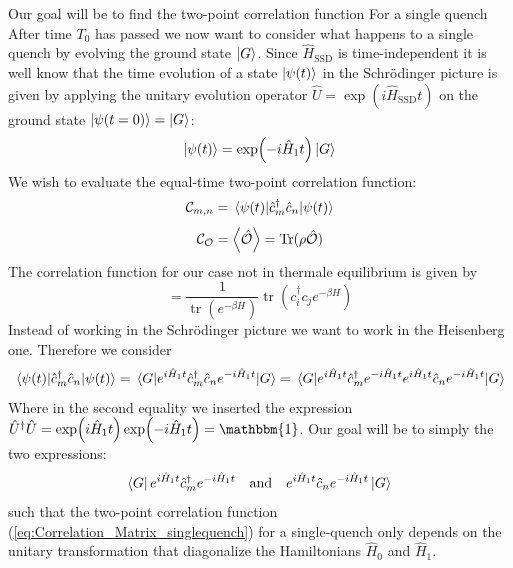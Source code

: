 \documentclass[11pt, a4paper]{article}
\theoremstyle{definition} %
\begin{document}
	Our goal will be to find the two-point correlation function
	For a single quench 
	After time $T_0$ has passed we now want to consider what happens to a single quench by evolving the ground state $\ket{G}$. Since $\hat{H}_\text{SSD}$ is time-independent it is well know that the time evolution of a state $\ket{\psi(t)}$ in the Schrödinger picture is given by applying the unitary evolution operator $\hat{U} = \exp(i\hat{H}_\text{SSD} t)$ on the ground state $\ket{\psi(t=0)} = \ket{G}$:
	\begin{equation}
		\ket{\psi(t)} = \exp(-i \hat{H}_1 t) \ket{G}
	\end{equation}
	We wish to evaluate the equal-time two-point correlation function:
	\begin{equation}
	\mathcal{C}_{m,n} = \mel{\psi(t)}{\hat{c}_m^\dagger \hat{c}_n}{\psi(t)}	
	\end{equation}
	\begin{equation}
		\mathcal{C}_{\mathcal{O}} = \expval{\hat{\mathcal{O}}} = \text{Tr}(\rho \hat{\mathcal{O}})
	\end{equation}
	The correlation function for our case not in thermale equilibrium is given by
	\begin{equation}
		 = \frac{1}{\operatorname{tr}\left(e^{-\beta H}\right)} \operatorname{tr}\left(c_{i}^{\dagger} c_{j} e^{-\beta H}\right)
	\end{equation}
Instead of working in the Schrödinger picture we want to work in the Heisenberg one. Therefore we consider
	\begin{equation}
		\mel{\psi(t)}{\hat{c}_m^\dagger \hat{c}_n}{\psi(t)} = \mel{G}{e^{i \hat{H}_1 t} \hat{c}_m^\dagger \hat{c}_n e^{-i \hat{H}_1 t}}{G} = \mel{G}{e^{i\hat{H}_1 t} \hat{c}_m^\dagger e^{-i \hat{H}_1 t} e^{i \hat{H}_1 t} \hat{c}_n e^{-i\hat{H}_1 t}}{G}
		\label{eq:Correlation_Matrix_singlequench}
	\end{equation}
	Where in the second equality we inserted the expression $\hat{U}^\dagger \hat{U} = \exp(i \hat{H}_1 t)\exp(-i \hat{H}_1 t) = \mathbbm{1}$. Our goal will be to simply the two expressions:
	\begin{equation}
		\bra{G} e^{i\hat{H}_1 t} \hat{c}_m^\dagger e^{-i \hat{H}_1 t} \qq{and}  e^{i \hat{H}_1 t} \hat{c}_n e^{-i\hat{H}_1 t}\ket{G}
	\end{equation}
	such that the two-point correlation function (\ref{eq:Correlation_Matrix_singlequench}) for a single-quench only depends on the unitary transformation that diagonalize the Hamiltonians $\hat{H}_0$ and $\hat{H}_1$. \\
	
\end{document}
